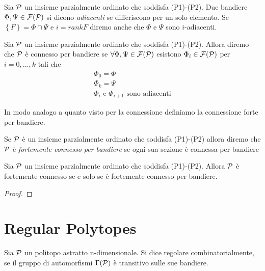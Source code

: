 \begin{defin}
Sia $\mathcal{P}$ un insieme parzialmente ordinato che soddisfa (P1)-(P2). Due bandiere 
$\Phi,\Psi\in\mathcal{F}(\mathcal{P})$ si dicono \emph{adiacenti}
se differiscono per un solo elemento. Se $\left\{F\right\}=\Phi\cap\Psi$ e 
$i=rankF$ diremo anche che $\Phi$ e $\Psi$ sono $i$-adiacenti.\\
\end{defin}





\begin{defin}
Sia $\mathcal{P}$ un insieme parzialmente ordinato che soddisfa (P1)-(P2). Allora diremo 
che $\mathcal{P}$ \`e connesso per bandiere se $\forall\Phi,\Psi\in\mathcal{F}(\mathcal{P})$
esistono $\Phi_i\in\mathcal{F}(\mathcal{P})$ per $i=0,\dots,k$ tali che
\begin{gather*}
\Phi_0=\Phi\\
\Phi_k=\Psi\\
\Phi_i\text{ e }\Phi_{i+1}\text{ sono adiacenti}
\end{gather*}
\end{defin}
In modo analogo a quanto visto per la connessione definiamo la connessione forte 
per bandiere.
\begin{defin}
Se $\mathcal{P}$ \`e un insieme parzialmente ordinato che soddisfa (P1)-(P2) allora 
diremo che $\mathcal{P}$ \`e \emph{fortemente connesso per bandiere} se
ogni sua sezione \`e connessa per bandiere
\end{defin}

\begin{prop}
Sia $\mathcal{P}$ un insieme parzialmente ordinato che soddisfa (P1)-(P2). Allora $\mathcal{P}$ 
\`e fortemente connesso se e solo se \`e fortemente
connesso per bandiere.
\end{prop}
\begin{proof}

\end{proof}



\section{Regular Polytopes}

\begin{defin}
Sia $\mathcal{P}$ un politopo astratto n-dimensionale. Si dice regolare combinatorialmente, se il gruppo di automorfismi $\Gamma(\mathcal{P})$ \`e transitivo sulle sue bandiere. 
\end{defin}


